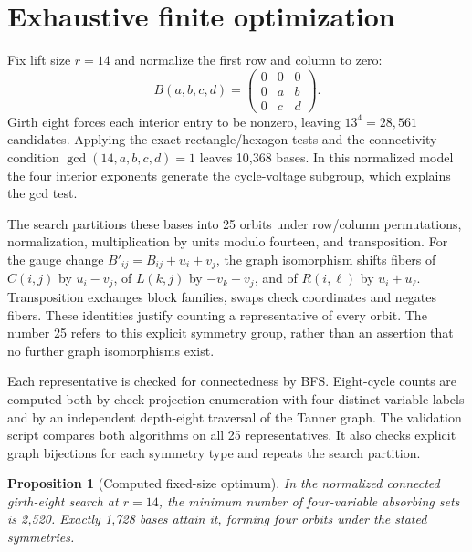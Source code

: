 \documentclass[11pt]{article}
\newtheorem{proposition}[theorem]{Proposition}
\theoremstyle{definition}
\theoremstyle{remark}
\begin{document}
\section{Exhaustive finite optimization}\label{sec:optimization}

Fix lift size $r=14$ and normalize the first row and column to zero:
\begin{equation}\label{eq:normalized}
 B(a,b,c,d)=\begin{pmatrix}0&0&0\\0&a&b\\0&c&d\end{pmatrix}.
\end{equation}
Girth eight forces each interior entry to be nonzero, leaving
$13^4=28,561$ candidates. Applying the exact rectangle/hexagon tests
and the connectivity condition $\gcd(14,a,b,c,d)=1$ leaves 10,368 bases.
In this normalized model the four interior exponents generate the
cycle-voltage subgroup, which explains the gcd test.

The search partitions these bases into 25 orbits under row/column
permutations, normalization, multiplication by units modulo fourteen,
and transposition. For the gauge change $B'_{ij}=B_{ij}+u_i+v_j$, the
graph isomorphism shifts fibers of $C(i,j)$ by $u_i-v_j$, of $L(k,j)$
by $-v_k-v_j$, and of $R(i,\ell)$ by $u_i+u_\ell$. Transposition
exchanges block families, swaps check coordinates and negates fibers.
These identities justify counting a representative of every orbit.
The number 25 refers to this explicit symmetry group, rather than an
assertion that no further graph isomorphisms exist.

Each representative is checked for connectedness by BFS. Eight-cycle
counts are computed both by check-projection enumeration with four
distinct variable labels and by an independent depth-eight traversal
of the Tanner graph. The validation script compares both algorithms
on all 25 representatives. It also checks explicit graph bijections
for each symmetry type and repeats the search partition.

\begin{proposition}[Computed fixed-size optimum]\label{prop:optimum}
In the normalized connected girth-eight search at $r=14$, the minimum
number of four-variable absorbing sets is 2,520. Exactly 1,728 bases
attain it, forming four orbits under the stated symmetries.
\end{proposition}
\end{document}
